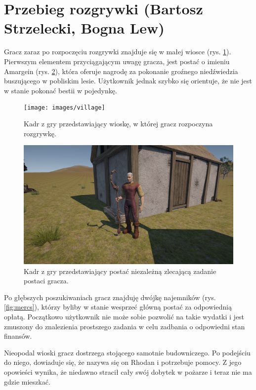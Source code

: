 \section{Przebieg rozgrywki (Bartosz Strzelecki, Bogna Lew)}
Gracz zaraz po rozpoczęciu rozgrywki znajduje się w małej wiosce (rys. \ref{fig:village}). Pierwszym
elementem przyciągającym uwagę gracza, jest postać o imieniu Amargein (rys. \ref{fig:npc}), która oferuje
nagrodę za pokonanie groźnego niedźwiedzia buszującego w pobliskim lesie. Użytkownik jednak
szybko się orientuje, że nie jest w stanie pokonać bestii w pojedynkę.

\begin{figure}[h]
\centering
\texttt{[image: images/village]}
\caption{Kadr z gry przedstawiający wioskę, w której gracz rozpoczyna rozgrywkę.}
\label{fig:village}
\end{figure}

\begin{figure}[h]
\centering
\includegraphics[width=1\textwidth]{images/npc1}
\caption{Kadr z gry przedstawiający postać niezależną zlecającą zadanie postaci gracza.}
\label{fig:npc}
\end{figure}

Po głębszych poszukiwaniach gracz znajduję dwójkę najemników (rys. \ref{fig:mercs}), którzy byliby w stanie
wesprzeć główną postać za odpowiednią opłatą. Początkowo użytkownik nie może sobie
pozwolić na takie wydatki i jest zmuszony do znalezienia prostszego zadania
w celu zadbania o odpowiedni stan finansów.

Nieopodal wioski gracz dostrzega stojącego samotnie budowniczego. Po podejściu do niego, dowiaduje się, że nazywa się on
Rhodan i potrzebuje pomocy. Z jego opowieści wynika, że niedawno stracił cały swój dobytek w
pożarze i teraz nie ma gdzie mieszkać.


